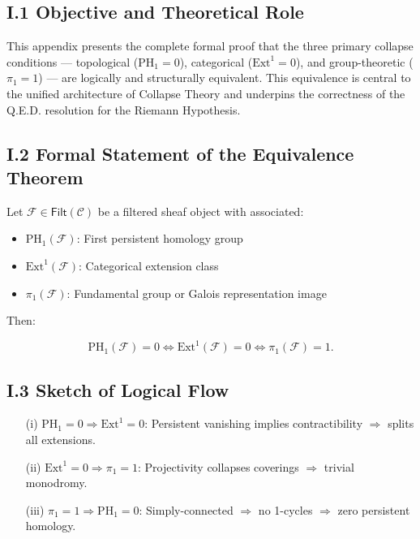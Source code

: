 \documentclass[11pt]{article}
\begin{document}
\subsection*{I.1 Objective and Theoretical Role}

This appendix presents the complete formal proof that the three primary collapse conditions — topological (\( \mathrm{PH}_1 = 0 \)), categorical (\( \mathrm{Ext}^1 = 0 \)), and group-theoretic (\( \pi_1 = 1 \)) — are logically and structurally equivalent. This equivalence is central to the unified architecture of Collapse Theory and underpins the correctness of the Q.E.D. resolution for the Riemann Hypothesis.

\subsection*{I.2 Formal Statement of the Equivalence Theorem}

Let \( \mathcal{F} \in \mathsf{Filt}(\mathcal{C}) \) be a filtered sheaf object with associated:

\begin{itemize}
  \item \( \mathrm{PH}_1(\mathcal{F}) \): First persistent homology group
  \item \( \mathrm{Ext}^1(\mathcal{F}) \): Categorical extension class
  \item \( \pi_1(\mathcal{F}) \): Fundamental group or Galois representation image
\end{itemize}

Then:

\[
\mathrm{PH}_1(\mathcal{F}) = 0
\iff
\mathrm{Ext}^1(\mathcal{F}) = 0
\iff
\pi_1(\mathcal{F}) = 1.
\]

\subsection*{I.3 Sketch of Logical Flow}

\begin{itemize}
  \item[(i)] \( \mathrm{PH}_1 = 0 \Rightarrow \mathrm{Ext}^1 = 0 \):  
  Persistent vanishing implies contractibility \( \Rightarrow \) splits all extensions.

  \item[(ii)] \( \mathrm{Ext}^1 = 0 \Rightarrow \pi_1 = 1 \):  
  Projectivity collapses coverings \( \Rightarrow \) trivial monodromy.

  \item[(iii)] \( \pi_1 = 1 \Rightarrow \mathrm{PH}_1 = 0 \):  
  Simply-connected \( \Rightarrow \) no 1-cycles \( \Rightarrow \) zero persistent homology.
\end{itemize}
\end{document}
